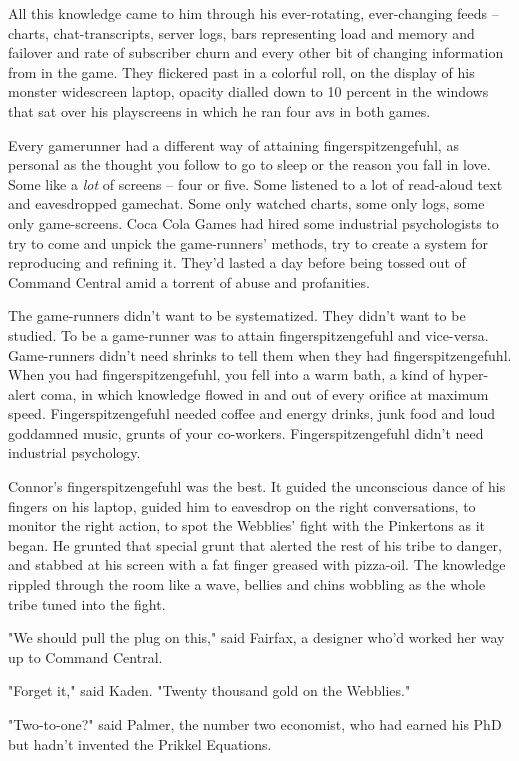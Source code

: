All this knowledge came to him through his ever-rotating,
ever-changing feeds -- charts, chat-transcripts, server logs, bars
representing load and memory and failover and rate of subscriber
churn and every other bit of changing information from in the game.
They flickered past in a colorful roll, on the display of his
monster widescreen laptop, opacity dialled down to 10 percent in
the windows that sat over his playscreens in which he ran four avs
in both games.

Every gamerunner had a different way of attaining
fingerspitzengefuhl, as personal as the thought you follow to go to
sleep or the reason you fall in love. Some like a \emph{lot} of
screens -- four or five. Some listened to a lot of read-aloud text
and eavesdropped gamechat. Some only watched charts, some only
logs, some only game-screens. Coca Cola Games had hired some
industrial psychologists to try to come and unpick the
game-runners' methods, try to create a system for reproducing and
refining it. They'd lasted a day before being tossed out of Command
Central amid a torrent of abuse and profanities.

The game-runners didn't want to be systematized. They didn't want
to be studied. To be a game-runner was to attain
fingerspitzengefuhl and vice-versa. Game-runners didn't need
shrinks to tell them when they had fingerspitzengefuhl. When you
had fingerspitzengefuhl, you fell into a warm bath, a kind of
hyper-alert coma, in which knowledge flowed in and out of every
orifice at maximum speed. Fingerspitzengefuhl needed coffee and
energy drinks, junk food and loud goddamned music, grunts of your
co-workers. Fingerspitzengefuhl didn't need industrial psychology.

Connor's fingerspitzengefuhl was the best. It guided the
unconscious dance of his fingers on his laptop, guided him to
eavesdrop on the right conversations, to monitor the right action,
to spot the Webblies' fight with the Pinkertons as it began. He
grunted that special grunt that alerted the rest of his tribe to
danger, and stabbed at his screen with a fat finger greased with
pizza-oil. The knowledge rippled through the room like a wave,
bellies and chins wobbling as the whole tribe tuned into the
fight.

"We should pull the plug on this," said Fairfax, a designer who'd
worked her way up to Command Central.

"Forget it," said Kaden. "Twenty thousand gold on the Webblies."

"Two-to-one?" said Palmer, the number two economist, who had earned
his PhD but hadn't invented the Prikkel Equations.

